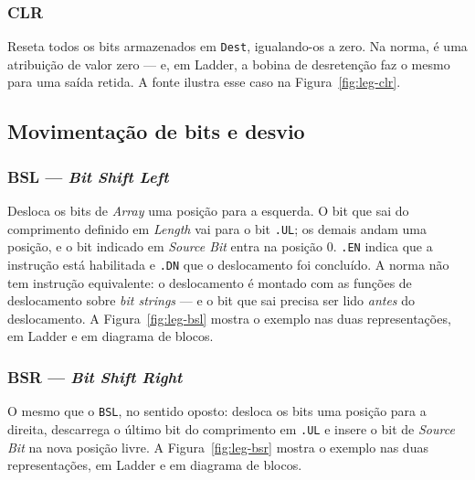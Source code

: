 \subsubsection{CLR}

Reseta todos os bits armazenados em \texttt{Dest}, igualando-os a zero. Na norma, é uma atribuição de
valor zero --- e, em Ladder, a bobina de desretenção faz o mesmo para uma saída retida.
A fonte ilustra esse caso na Figura~\ref{fig:leg-clr}.


\subsection{Movimentação de bits e desvio}

\subsubsection{BSL --- \emph{Bit Shift Left}}

Desloca os bits de \emph{Array} uma posição para a esquerda. O bit que sai do comprimento definido em
\emph{Length} vai para o bit \texttt{.UL}; os demais andam uma posição, e o bit indicado em
\emph{Source Bit} entra na posição 0. \texttt{.EN} indica que a instrução está habilitada e
\texttt{.DN} que o deslocamento foi concluído. A norma não tem instrução equivalente: o
deslocamento é montado com as funções de deslocamento sobre \emph{bit strings} --- e o bit que sai
precisa ser lido \emph{antes} do deslocamento.
A Figura~\ref{fig:leg-bsl} mostra o exemplo nas duas representações, em Ladder e em diagrama de blocos.



\subsubsection{BSR --- \emph{Bit Shift Right}}

O mesmo que o \texttt{BSL}, no sentido oposto: desloca os bits uma posição para a direita, descarrega o
último bit do comprimento em \texttt{.UL} e insere o bit de \emph{Source Bit} na nova posição livre.
A Figura~\ref{fig:leg-bsr} mostra o exemplo nas duas representações, em Ladder e em diagrama de blocos.

